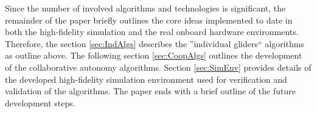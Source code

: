\documentclass{ifacconf}
\begin{document}

Since the number of involved algorithms and technologies is significant, the remainder of the paper briefly outlines the core ideas implemented to date in both the high-fidelity simulation and the real onboard hardware environments. Therefore, the section \ref{sec:IndAlgs} describes the ''individual gliders`` algorithms as outline above. The following section \ref{sec:CoopAlgs}  outlines the development of the collaborative autonomy algorithms. Section \ref{sec:SimEnv} provides details of the developed high-fidelity simulation environment used for verification and validation of the algorithms. The paper ends with a brief outline of the future development steps.
\end{document}
